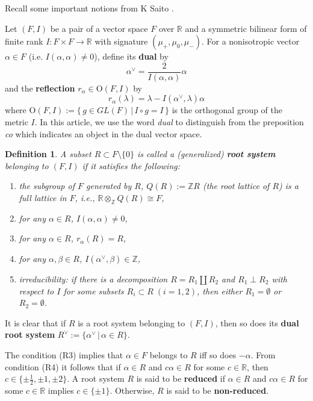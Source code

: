 \documentclass[11pt]{amsart}
\newcommand{\R}{\mathbb{R}}
\newcommand{\Z}{\mathbb{Z}}
\newtheorem{defn}{Definition}[section]
\begin{document}
\smallskip

Recall some important notions from K Saito \cite{Saito1985}. 
\smallskip

Let $(F,I)$ 
be a pair of a vector space $F$ over $\R$  and  a symmetric bilinear form of finite rank $I: F\times F \rightarrow \R$ with signature $(\mu_+, \mu_0, \mu_-)$. For a nonisotropic vector $\alpha \in F$ (i.e. $I(\alpha, \alpha) \neq 0$), define its \textbf{dual} by
$$
\alpha^\vee=\frac{2}{I(\alpha,\alpha)}\alpha 
$$
and the \textbf{reflection} $r_\alpha \in \mathrm{O}(F,I)$ by
$$
r_\alpha(\lambda)=\lambda-I(\alpha^\vee, \lambda)\alpha
$$
where $\mathrm{O}(F,I):={\{\,g \in GL(F)\,\vert\, I \circ g=I\,\}}$ is the orthogonal group of 
the metric $I$. In this article, we use the word \textit{dual} to distinguish from the 
preposition \textit{co} which indicates an object in the dual vector space.
\begin{defn}\label{defn_root-sys}
A subset $R \subset F \setminus \{0\}$ is called a (generalized) 
\textbf{root system}  belonging to $(F,I)$ if it satisfies the following:
\begin{enumerate}
\item[(R1)] the subgroup of $F$ generated by $R$, $Q(R):={\Z}R$ (the root lattice of $R$) is a full lattice in $F$, i.e., $\R \otimes_{\Z} Q(R) \cong F$, 
\item[(R2)] for any $\alpha \in R$, $I(\alpha, \alpha) \neq 0$, 
\item[(R3)] for any $\alpha \in R$, $r_\alpha(R)=R$,
\item[(R4)] for any $\alpha, \beta \in R$, $I(\alpha^\vee,\beta) \in \Z$,  
\item[(R5)] irreducibility: if there is a decomposition $R=R_1 \amalg R_2$ and $R_1 \perp R_2$ with respect to $I$ for some subsets $R_i \subset R\; (i=1,2)$, then either $R_1=\emptyset$ or $R_2=\emptyset$.
\end{enumerate}
\end{defn}

It is clear that if $R$ is a root system belonging to $(F,I)$, then so does its \textbf{dual root system} $R^\vee:=\{\alpha^\vee\, \vert \, \alpha \in R\}$. 

The condition (R3) implies that $\alpha \in F$ belongs to $R$ iff so does 
$-\alpha$. From condition (R4) it follows that if $\alpha \in R$ and $c \alpha \in R$ 
for some $c \in \R$, then $c \in \{ \pm \frac{1}{2}, \pm 1, \pm 2\}$.  
A root system $R$ is said to be 
\textbf{reduced}
if $\alpha \in R$ and $c \alpha \in R$ for some $c \in \R$ implies $c \in \{ \pm 1\}$. Otherwise, $R$ is said to be \textbf{non-reduced}. 
\smallskip
\end{document}
